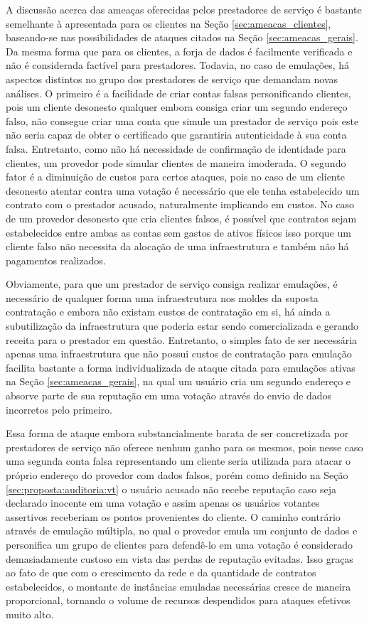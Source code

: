 A discussão acerca das ameaças oferecidas pelos prestadores de serviço é bastante semelhante à apresentada para os clientes na Seção \ref{sec:ameacas_clientes}, baseando-se nas possibilidades de ataques citados na Seção \ref{sec:ameacas_gerais}. Da mesma forma que para os clientes, a forja de dados é facilmente verificada e não é considerada factível para prestadores. Todavia, no caso de emulações, há aspectos distintos no grupo dos prestadores de serviço que demandam novas análises. O primeiro é a facilidade de criar contas falsas personificando clientes, pois um cliente desonesto qualquer embora consiga criar um segundo endereço falso, não consegue criar uma conta que simule um prestador de serviço pois este não seria capaz de obter o certificado que garantiria autenticidade à sua conta falsa. Entretanto, como não há necessidade de confirmação de identidade para clientes, um provedor pode simular clientes de maneira imoderada. O segundo fator é a diminuição de custos para certos ataques, pois no caso de um cliente desonesto atentar contra uma votação é necessário que ele tenha estabelecido um contrato com o prestador acusado, naturalmente implicando em custos. No caso de um provedor desonesto que cria clientes falsos, é possível que contratos sejam estabelecidos entre ambas as contas sem gastos de ativos físicos isso porque um cliente falso não necessita da alocação de uma infraestrutura e também não há pagamentos realizados.

%
Obviamente, para que um prestador de serviço consiga realizar emulações, é necessário de qualquer forma uma infraestrutura nos moldes da suposta contratação e embora não existam custos de contratação em si, há ainda a subutilização da infraestrutura que poderia estar sendo comercializada e gerando receita para o prestador em questão. Entretanto, o simples fato de ser necessária apenas uma infraestrutura que não possui custos de contratação para emulação facilita bastante a forma individualizada de ataque citada para emulações ativas na Seção \ref{sec:ameacas_gerais}, na qual um usuário cria um segundo endereço e absorve parte de sua reputação em uma votação através do envio de dados incorretos pelo primeiro.

Essa forma de ataque embora substancialmente barata de ser concretizada por prestadores de serviço não oferece nenhum ganho para os mesmos, pois nesse caso uma segunda conta falsa representando um cliente seria utilizada para atacar o próprio endereço do provedor com dados falsos, porém como definido na Seção \ref{sec:proposta:auditoria:vt} o usuário acusado não recebe reputação caso seja declarado inocente em uma votação e assim apenas os usuários votantes assertivos receberiam os pontos provenientes do cliente. O caminho contrário através de emulação múltipla, no qual o provedor emula um conjunto de dados e personifica um grupo de clientes para defendê-lo em uma votação é considerado demasiadamente custoso em vista das perdas de reputação evitadas. Isso graças ao fato de que com o crescimento da rede e da quantidade de contratos estabelecidos, o montante de instâncias emuladas necessárias cresce de maneira proporcional, tornando o volume de recursos despendidos para ataques efetivos muito alto. 

